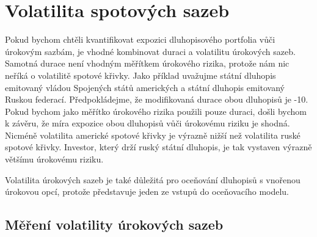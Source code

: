 \documentclass[a4paper]{book}
\begin{document}
\section{Volatilita spotových sazeb}

Pokud bychom chtěli kvantifikovat expozici dluhopisového portfolia vůči úrokovým sazbám, je vhodné kombinovat duraci a volatilitu úrokových sazeb. Samotná durace není vhodným měřítkem úrokového rizika, protože nám nic neříká o volatilitě spotové křivky. Jako příklad uvažujme státní dluhopis emitovaný vládou Spojených států amerických a státní dluhopis emitovaný Ruskou federací. Předpokládejme, že modifikovaná durace obou dluhopisů je -10. Pokud bychom jako měřítko úrokového rizika použili pouze duraci, došli bychom k závěru, že míra expozice obou dluhopisů vůči úrokovému riziku je shodná. Nicméně volatilita americké spotové křivky je výrazně nižší než volatilita ruské spotové křivky. Investor, který drží ruský státní dluhopis, je tak vystaven výrazně většímu úrokovému riziku.

Volatilita úrokových sazeb je také důležitá pro oceňování dluhopisů s vnořenou úrokovou opcí, protože představuje jeden ze vstupů do oceňovacího modelu.

\subsection{Měření volatility úrokových sazeb}
\end{document}
